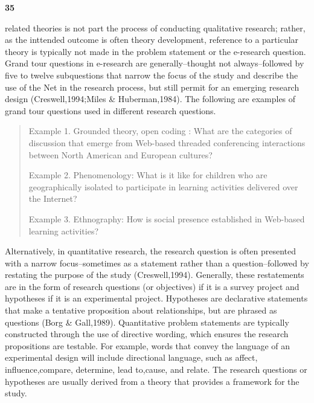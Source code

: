 \documentclass{book}
\begin{document}
\begin{flushright}
\hspace*{0.5cm}
\textbf{35}
\end{flushright}
\vspace*{0.7}
related theories is not part the process of conducting qualitative research; rather, as the inttended outcome is often theory development, reference to a particular theory is typically not made in the problem statement or the e-research question.
\\\hspace*{0.5cm} Grand tour questions in e-research are generally--thought not always--followed by five to twelve subquestions that narrow the focus of the study and describe the use of the Net in the research process, but still permit for an emerging research design (Creswell,1994;Miles & Huberman,1984). The following are examples of grand tour questions used in different research questions.
\begin{quote}
Example 1. Grounded theory, open coding : What are the categories of discussion that emerge from Web-based threaded conferencing interactions between North American and European cultures?

Example 2. Phenomenology: What is it like for children who are geographically isolated to participate in learning activities delivered over the Internet?

Example 3. Ethnography: How is social presence established in Web-based learning activities?
\end{quote}
Alternatively, in quantitative research, the research question is often presented with a narrow focus--sometimes as a statement rather than a question--followed by restating the purpose of the study (Creswell,1994). Generally, these restatements are in the form of research questions (or objectives) if it is a survey project and hypotheses if it is an experimental project. Hypotheses are declarative statements that make a tentative proposition about relationships, but are phrased as questions (Borg & Gall,1989). Quantitative problem statements are typically constructed through the use of directive wording, which ensures the research propositions are testable. For example, words that convey the language of an experimental design will include directional language, such as affect, influence,compare, determine, lead to,cause, and relate. The research questions or hypotheses are usually derived from a theory that provides a framework for the study.
\end{document}
